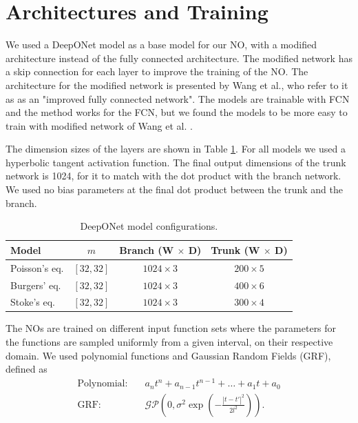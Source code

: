 \documentclass[final,1p,times]{elsarticle}
\theoremstyle{plain} %
\theoremstyle{definition} %
\theoremstyle{remark} %
\begin{document}
\newpage
\appendix

\section{Architectures and Training}\label{appendix_a}

We used a DeepONet model as a base model for our NO, with a modified architecture instead of the fully connected architecture. The modified network has a skip connection for each layer to improve the training of the NO. The architecture for the modified network is presented by Wang et al.\cite{wang2021understanding}, who refer to it as as an "improved fully connected network". The models are trainable with FCN and the method works for the FCN, but we found the models to be more easy to train with modified network of Wang et al. \cite{wang2021understanding}.

The dimension sizes of the layers are shown in Table \ref{tab:appendix_architecture}. For all models we used a hyperbolic tangent activation function. The final output dimensions of the trunk network is 1024, for it to match with the dot product with the branch network. We used no bias parameters at the final dot product between the trunk and the branch. 

\begin{table}[h!]
\centering
\caption{DeepONet model configurations.}
\label{tab:appendix_architecture}
\begin{tabular}{lccc}
\toprule
\textbf{Model} & $m$  & \makecell{Branch\\(W $\times$ D)} & \makecell{Trunk\\(W $\times$ D)} \\
\midrule
Poisson's eq.             & $[32,32]$     & $1024 \times 3$ & $200 \times 5$ \\
Burgers' eq. & $[32,32]$     & $1024 \times 3$ & $400 \times 6$ \\
Stoke's eq.             & $[32,32]$     & $1024 \times 3$ & $300 \times 4$ \\
\bottomrule
\end{tabular}
\end{table}

The NOs are trained on different input function sets where the parameters for the functions are sampled uniformly from a given interval, on their respective domain. We used polynomial functions and Gaussian Random Fields (GRF), defined as
%
\begin{equation}\label{function_sets}
\begin{aligned}
    \text{Polynomial}:&\quad a_n t^n + a_{n-1} t^{n-1} + \dots + a_1 t + a_0\\
    \text{GRF}:&\quad \mathcal{GP}(0, \sigma^2 \exp ( -\frac{|t - t'|^2}{2l^2})).
\end{aligned}
\end{equation}
\end{document}
